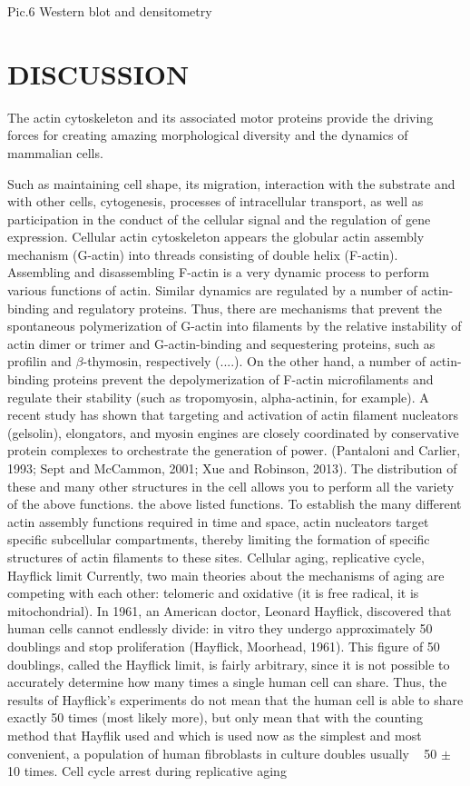 \documentclass[a4paper,12pt]{article}
\begin{document}
Pic.6 Western blot and densitometry



\section{DISCUSSION}

The actin cytoskeleton and its associated motor proteins provide the driving forces for creating amazing morphological diversity and the dynamics of mammalian cells.

Such as maintaining cell shape, its migration, interaction with the substrate and with other cells, cytogenesis, processes of intracellular transport, as well as participation in the conduct of the cellular signal and the regulation of gene expression.
Cellular actin cytoskeleton appears
the globular actin assembly mechanism (G-actin) into threads consisting of double helix (F-actin).
Assembling and disassembling F-actin is a very dynamic process to perform various functions of actin. Similar dynamics are regulated by a number of actin-binding and regulatory proteins.
Thus, there are mechanisms that prevent the spontaneous polymerization of G-actin into filaments by the relative instability of actin dimer or trimer and G-actin-binding and sequestering proteins, such as profilin and $\beta$-thymosin, respectively (....).
On the other hand, a number of actin-binding proteins prevent the depolymerization of F-actin microfilaments and regulate their stability (such as tropomyosin, alpha-actinin, for example). A recent study has shown that targeting and activation of actin filament nucleators (gelsolin), elongators, and myosin engines are closely coordinated by conservative protein complexes to orchestrate the generation of power. (Pantaloni and Carlier, 1993; Sept and McCammon, 2001; Xue and Robinson, 2013). The distribution of these and many other structures in the cell allows you to perform all the variety of the above functions.
the above listed functions.
To establish the many different actin assembly functions required in time and space, actin nucleators target specific subcellular compartments, thereby limiting the formation of specific structures of actin filaments to these sites.
Cellular aging, replicative cycle, Hayflick limit
Currently, two main theories about the mechanisms of aging are competing with each other: telomeric and oxidative (it is free radical, it is mitochondrial). In 1961, an American doctor, Leonard Hayflick, discovered that human cells cannot endlessly divide: in vitro they undergo approximately 50 doublings and stop proliferation (Hayflick, Moorhead, 1961). This figure of 50 doublings, called the Hayflick limit, is fairly arbitrary, since it is not possible to accurately determine how many times a single human cell can share. Thus, the results of Hayflick's experiments do not mean that the human cell is able to share exactly 50 times (most likely more), but only mean that with the counting method that Hayflik used and which is used now as the simplest and most convenient, a population of human fibroblasts in culture doubles usually ~ 50 $\pm$ 10 times.
Cell cycle arrest during replicative aging
\end{document}

